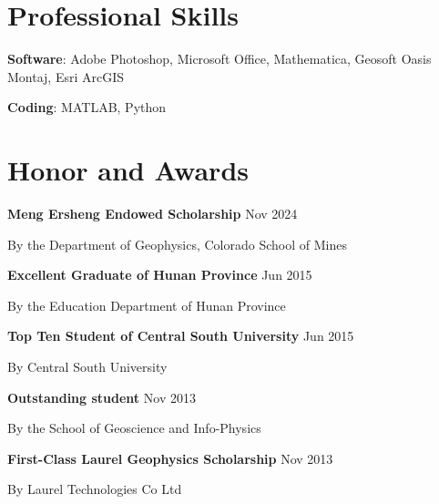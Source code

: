 \documentclass[paper=a4,fontsize=11pt]{scrartcl} %
\newcommand{\sepspace}{\vspace*{0.5em}}		%
\newcommand{\NewPart}[1]{\section*{{#1}}}
\begin{document}
\NewPart{Professional Skills}{}
\hspace{1em} \textbf{Software}: Adobe Photoshop, Microsoft Office, Mathematica, Geosoft Oasis Montaj, Esri ArcGIS

\hspace{0em} \textbf{Coding}: MATLAB, Python
\sepspace



    
\NewPart{Honor and Awards}{}
\hspace{1em} \textbf{Meng Ersheng Endowed Scholarship } \hspace{23em} Nov 2024

\hspace{0em} By the Department of Geophysics, Colorado School of Mines

\hspace{0em} \textbf{Excellent Graduate of Hunan Province} \hspace{22.7em} Jun 2015

\hspace{0em} By the Education Department of Hunan Province

\hspace{0em} \textbf{Top Ten Student of Central South University} \hspace{19.9em} Jun 2015

\hspace{0em} By Central South University

\hspace{0em} \textbf{Outstanding student} \hspace{30.4em} Nov 2013

\hspace{0em} By the School of Geoscience and Info-Physics

\hspace{0em} \textbf{First-Class Laurel Geophysics Scholarship} \hspace{20.6em} Nov 2013

\hspace{0em} By Laurel Technologies Co Ltd
\end{document}
